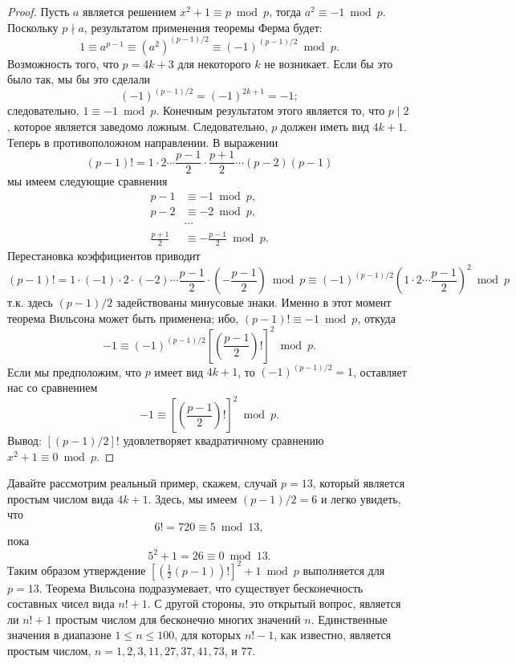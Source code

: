 \documentclass[11pt]{article}
\begin{document}
\begin{proof}
	Пусть $a$ является решением $x^2+1\equiv p\bmod p$, тогда $a^2\equiv-1\bmod p$. Поскольку $p\nmid a$, результатом применения теоремы Ферма будет:
		\[1\equiv a^{p-1}\equiv (a^2)^{(p-1)/2}\equiv (-1)^{(p-1)/2}\bmod p.\]
Возможность того, что $p=4k+3$ для некоторого $k$ не возникает. Если бы это было так, мы бы это сделали
	\[(-1)^{(p-1)/2}=(-1)^{2k+1}=-1;\]
следовательно, $1\equiv-1\bmod p$. Конечным результатом этого является то, что $p\mid2$, которое является заведомо ложным. Следовательно, $p$ должен иметь вид $4k+1$.
Теперь в противоположном направлении. В выражении
	\[(p-1)!=1\cdot2\cdots\frac{p-1}{2}\cdot\frac{p+1}{2}\cdots(p-2)(p-1)\]
мы имеем следующие сравнения
\begin{equation*}
\begin{split}
	p-1&\equiv-1\bmod p,
	\\p-2&\equiv-2\bmod p,
	\\&\cdots
	\\\frac{p+1}{2}&\equiv-\frac{p-1}{2}\bmod p.
\end{split}
\end{equation*}
Перестановка коэффициентов приводит 
	\[(p-1)!=1\cdot(-1)\cdot2\cdot(-2)\cdots\frac{p-1}{2}\cdot(-\frac{p-1}{2})\bmod p\equiv(-1)^{(p-1)/2}(1\cdot2\cdots\frac{p-1}{2})^2\bmod p\]
т.к. здесь $(p-1)/2$ задействованы минусовые знаки. Именно в этот момент теорема Вильсона может быть применена; ибо, $(p-1)!\equiv-1\bmod p$, откуда 
	\[-1\equiv(-1)^{(p-1)/2}[(\frac{p-1}{2})!]^2\bmod p.\]
Если мы предположим, что $p$ имеет вид $4k+1$, то $(-1)^{(p-1)/2}=1$, оставляет нас со сравнением 
	\[-1\equiv[(\frac{p-1}{2})!]^2\bmod p.\]
Вывод: $[(p-1)/2]!$ удовлетворяет квадратичному сравнению $x^2+1\equiv 0 \bmod p$.
\end{proof}
\parindent Давайте рассмотрим реальный пример, скажем, случай $p=13$, который является простым числом вида $4k+1$. Здесь, мы имеем $(p-1)/2=6$ и легко увидеть, что 
	\[6!=720\equiv5\bmod13,\]
пока
	\[5^2+1=26\equiv0\bmod13.\]
Таким образом утверждение $[(\frac{1}{2}(p-1))!]^2+1\bmod p$ выполняется для $p=13$.
Теорема Вильсона подразумевает, что существует бесконечность составных чисел вида $n!+1$. С другой стороны, это открытый вопрос, является ли $n!+1$ простым числом для бесконечно многих значений $n$. Единственные значения в диапазоне $1\le n\le100$, для которых $n!-1$, как известно, является простым числом, $n=1,2,3,11,27,37,41,73$, и $77$. 
\end{document}
